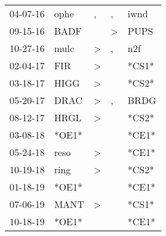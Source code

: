 \begin{supertabular}{p{0.07\textwidth}p{0.06\textwidth}p{0.02\textwidth}p{0.02\textwidth}p{0.06\textwidth}}
 04-07-16\textsuperscript{} &  ophe\textsuperscript{} &             , &             , &           iwnd\textsuperscript{} \\
 09-15-16\textsuperscript{} &  BADF\textsuperscript{} &               &  \textgreater &           PUPS\textsuperscript{} \\
 10-27-16\textsuperscript{} &  mulc\textsuperscript{} &  \textgreater &             , &            n2f\textsuperscript{} \\
 02-04-17\textsuperscript{} &   FIR\textsuperscript{} &  \textgreater &               &                            *CS1* \\
 03-18-17\textsuperscript{} &  HIGG\textsuperscript{} &  \textgreater &               &                            *CS2* \\
 05-20-17\textsuperscript{} &  DRAC\textsuperscript{} &  \textgreater &             , &           BRDG\textsuperscript{} \\
 08-12-17\textsuperscript{} &  HRGL\textsuperscript{} &  \textgreater &               &                            *CS2* \\
 03-08-18\textsuperscript{} &                   *OE1* &               &               &                            *CE1* \\
 05-24-18\textsuperscript{} &  reso\textsuperscript{} &  \textgreater &               &                            *CE1* \\
 10-19-18\textsuperscript{} &  ring\textsuperscript{} &  \textgreater &               &                            *CS2* \\
 01-18-19\textsuperscript{} &                   *OE1* &               &               &                            *CE1* \\
 07-06-19\textsuperscript{} &  MANT\textsuperscript{} &  \textgreater &               &                            *CS1* \\
 10-18-19\textsuperscript{} &                   *OE1* &               &               &                            *CE1* \\
\end{supertabular}
